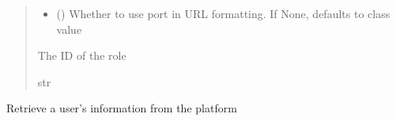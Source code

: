 \documentclass[letterpaper,10pt,english]{sphinxmanual}
\begin{document}
\begin{fulllineitems}
\begin{fulllineitems}
\begin{quote}
\begin{description}
\begin{itemize}
\item {} 
\sphinxAtStartPar
{} (\sphinxstyleliteralemphasis{\sphinxupquote{ (}}\sphinxstyleliteralemphasis{\sphinxupquote{)}}) \textendash{} Whether to use port in URL formatting. If None, defaults to class value

\end{itemize}

\sphinxAtStartPar
{} \textendash{} The ID of the role

\sphinxAtStartPar
str

\end{description}\end{quote}

\end{fulllineitems}


\begin{fulllineitems}
\label{\detokenize{aisquared.platform:aisquared.platform.AISquaredPlatformClient.AISquaredPlatformClient.get_user}}
\pysigstartsignatures
{}
\pysigstopsignatures
\sphinxAtStartPar
Retrieve a user’s information from the platform


\end{fulllineitems}
\end{fulllineitems}
\end{document}
